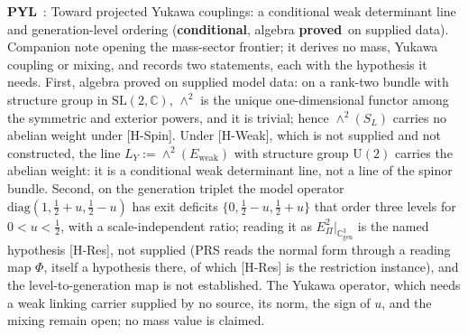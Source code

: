 \documentclass[11pt,a4paper]{article}
\providecommand{\SL}{\mathrm{SL}}
\newcommand{\sproved}{\textcolor{cproved}{\textbf{proved}}}
\newcommand{\scond}{\textcolor{ccond}{\textbf{conditional}}}
\begin{document}
    \textbf{PYL}~\cite{Beau2026pyl}: Toward projected Yukawa couplings: a conditional weak determinant line and
    generation-level ordering (\scond, algebra \sproved\ on supplied data).
    Companion note opening the mass-sector frontier; it derives no mass, Yukawa coupling or mixing, and records two
    statements, each with the hypothesis it needs.
    First, algebra proved on supplied model data: on a rank-two bundle with structure group in $\SL(2,\mathbb{C})$,
    $\wedge^2$ is the unique one-dimensional functor among the symmetric and exterior powers, and it is trivial; hence
    $\wedge^2(S_L)$ carries no abelian weight under [H-Spin].
    Under [H-Weak], which is not supplied and not constructed, the line $L_Y := \wedge^2(E_{\mathrm{weak}})$ with
    structure group $\mathrm{U}(2)$ carries the abelian weight: it is a conditional weak determinant line, not a line
    of the spinor bundle.
    Second, on the generation triplet the model operator $\mathrm{diag}(1, \tfrac12 + u, \tfrac12 - u)$ has exit
    deficits $\{0, \tfrac12 - u, \tfrac12 + u\}$ that order three levels for $0 < u < \tfrac12$, with a
    scale-independent ratio; reading it as $E_\Pi^2|_{\mathbb{C}^3_{\mathrm{gen}}}$ is the named hypothesis [H-Res],
    not supplied (PRS reads the normal form through a reading map $\Phi$, itself a hypothesis there, of which [H-Res]
    is the restriction instance), and the level-to-generation map is not established.
    The Yukawa operator, which needs a weak linking carrier supplied by no source, its norm, the sign of $u$, and the
    mixing remain open; no mass value is claimed.
\end{document}
